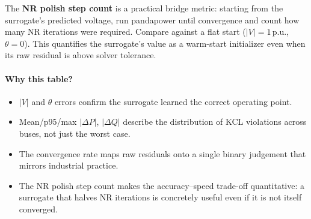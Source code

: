 \documentclass{article}
\begin{document}
The \textbf{NR polish step count} is a practical bridge metric: starting
from the surrogate's predicted voltage, run pandapower until convergence
and count how many NR iterations were required.  Compare against a flat
start ($|V|=1$\,p.u., $\theta=0$).  This quantifies the surrogate's value
as a warm-start initializer even when its raw residual is above solver
tolerance.

\paragraph{Why this table?}
\begin{itemize}[noitemsep]
  \item $|V|$ and $\theta$ errors confirm the surrogate learned the
    correct operating point.
  \item Mean/p95/max $|\Delta P|$, $|\Delta Q|$ describe the distribution
    of KCL violations across buses, not just the worst case.
  \item The convergence rate maps raw residuals onto a single binary
    judgement that mirrors industrial practice.
  \item The NR polish step count makes the accuracy--speed trade-off
    quantitative: a surrogate that halves NR iterations is concretely
    useful even if it is not itself converged.
\end{itemize}
\end{document}
